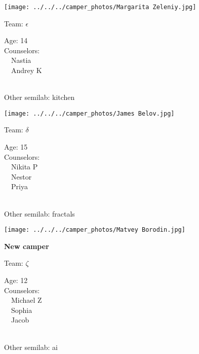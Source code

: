 \documentclass[10pt,letterpaper, landscape]{article}
\begin{document}
\horizontalshiftfornextsticker
\renewcommand{\baselinestretch}{1} \begin{sticker}
\noindent\begin{minipage}{0.5\textwidth}\texttt{[image: ../../../camper\_photos/Margarita Zeleniy.jpg]}\end{minipage}\begin{minipage}{0.45\textwidth}
Team: {\Large $\epsilon$}

Age:        14\\
Counselors: \\\ \ Nastia\\\ \ Andrey K\\
\end{minipage} \\ \vspace{0.07in}
Other semilab: kitchen
\end{sticker}
\verticalshiftfornextsticker
\renewcommand{\baselinestretch}{1} \begin{sticker}
\noindent\begin{minipage}{0.5\textwidth}\texttt{[image: ../../../camper\_photos/James Belov.jpg]}\end{minipage}\begin{minipage}{0.45\textwidth}
Team: {\Large $\delta$}

Age:        15\\
Counselors: \\\ \ Nikita P\\\ \ Nestor\\\ \ Priya\\
\end{minipage} \\ \vspace{0.07in}
Other semilab: fractals
\end{sticker}
\horizontalshiftfornextsticker
\renewcommand{\baselinestretch}{1} \begin{sticker}
\noindent\begin{minipage}{0.5\textwidth}\texttt{[image: ../../../camper\_photos/Matvey Borodin.jpg]}\end{minipage}\begin{minipage}{0.45\textwidth}
\textbf{New camper} 

Team: {\Large $\zeta$}

Age:        12\\
Counselors: \\\ \ Michael Z\\\ \ Sophia\\\ \ Jacob\\
\end{minipage} \\ \vspace{0.07in}
Other semilab: ai
\end{sticker}
\end{document}
